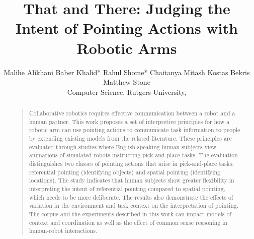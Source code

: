 \documentclass[letterpaper]{article}
\begin{document}
%
\title{That and There: Judging the Intent of Pointing Actions with Robotic Arms}



\author{Malihe Alikhani \quad  Baber Khalid* \quad Rahul Shome* \quad Chaitanya Mitash \quad Kostas Bekris \quad Matthew Stone\\
  Computer Science, \quad Rutgers University, }
  
\maketitle
\begin{abstract}
\begin{quote}

Collaborative robotics requires effective communication between a robot and a human partner. This work proposes a set of interpretive principles for how a robotic arm can use pointing actions to communicate task information to people by extending existing models from the related literature. These principles are evaluated through studies where English-speaking human subjects view animations of simulated robots instructing pick-and-place tasks. The evaluation distinguishes two classes of pointing actions that arise in pick-and-place tasks: referential pointing (identifying objects) and spatial pointing (identifying locations). The study indicates that human subjects show greater flexibility in interpreting the intent of referential pointing compared to spatial pointing, which needs to be more deliberate. The results also demonstrate the effects of variation in the environment and task context on the interpretation of pointing. The corpus and the experiments described in this work can impact models of context and coordination as well as the effect of common sense reasoning in human-robot interactions.

\end{quote}
\end{abstract}









 

\end{document}
